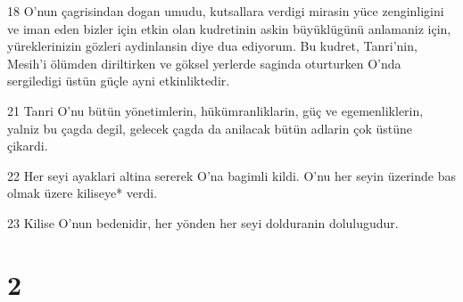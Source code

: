 \par 18 O'nun çagrisindan dogan umudu, kutsallara verdigi mirasin yüce zenginligini ve iman eden bizler için etkin olan kudretinin askin büyüklügünü anlamaniz için, yüreklerinizin gözleri aydinlansin diye dua ediyorum. Bu kudret, Tanri'nin, Mesih'i ölümden diriltirken ve göksel yerlerde saginda oturturken O'nda sergiledigi üstün güçle ayni etkinliktedir.
\par 21 Tanri O'nu bütün yönetimlerin, hükümranliklarin, güç ve egemenliklerin, yalniz bu çagda degil, gelecek çagda da anilacak bütün adlarin çok üstüne çikardi.
\par 22 Her seyi ayaklari altina sererek O'na bagimli kildi. O'nu her seyin üzerinde bas olmak üzere kiliseye* verdi.
\par 23 Kilise O'nun bedenidir, her yönden her seyi dolduranin dolulugudur.

\chapter{2}


